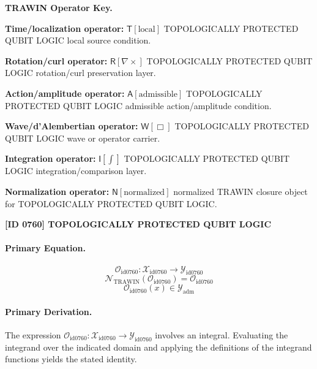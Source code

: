 \par\vspace{0.45\baselineskip}
\noindent\begin{minipage}[t]{\linewidth}
\begingroup
\small
\raggedright
\textbf{TRAWIN Operator Key.}\par
\noindent\textbf{Time/localization operator:} $\mathsf{T}\!\left[\mathrm{local}\right]$ TOPOLOGICALLY PROTECTED QUBIT LOGIC local source condition.\par
\noindent\textbf{Rotation/curl operator:} $\mathsf{R}\!\left[\nabla\times\right]$ TOPOLOGICALLY PROTECTED QUBIT LOGIC rotation/curl preservation layer.\par
\noindent\textbf{Action/amplitude operator:} $\mathsf{A}\!\left[\mathrm{admissible}\right]$ TOPOLOGICALLY PROTECTED QUBIT LOGIC admissible action/amplitude condition.\par
\noindent\textbf{Wave/d'Alembertian operator:} $\mathsf{W}\!\left[\Box\right]$ TOPOLOGICALLY PROTECTED QUBIT LOGIC wave or operator carrier.\par
\noindent\textbf{Integration operator:} $\mathsf{I}\!\left[\int\right]$ TOPOLOGICALLY PROTECTED QUBIT LOGIC integration/comparison layer.\par
\noindent\textbf{Normalization operator:} $\mathsf{N}\!\left[\mathrm{normalized}\right]$ normalized TRAWIN closure object for TOPOLOGICALLY PROTECTED QUBIT LOGIC.\par
\endgroup
\end{minipage}

\clearpage
\noindent\textbf{[ID 0760] TOPOLOGICALLY PROTECTED QUBIT LOGIC}\par
\vspace{0.35em}
\paragraph{Primary Equation.}
\[
\mathcal{O}_{\mathrm{id0760}}:\mathcal{X}_{\mathrm{id0760}}\longrightarrow\mathcal{Y}_{\mathrm{id0760}}
\]
\[
\mathcal{N}_{\mathrm{TRAWIN}}(\mathcal{O}_{\mathrm{id0760}})=\mathcal{O}_{\mathrm{id0760}}
\]
\[
\mathcal{O}_{\mathrm{id0760}}(x)\in\mathcal{Y}_{\mathrm{adm}}
\]

\paragraph{Primary Derivation.}
The expression \( \mathcal{O}_{\mathrm{id0760}}:\mathcal{X}_{\mathrm{id0760}}\longrightarrow\mathcal{Y}_{\mathrm{id0760}} \) involves an integral. Evaluating the integrand over the indicated domain and applying the definitions of the integrand functions yields the stated identity.
